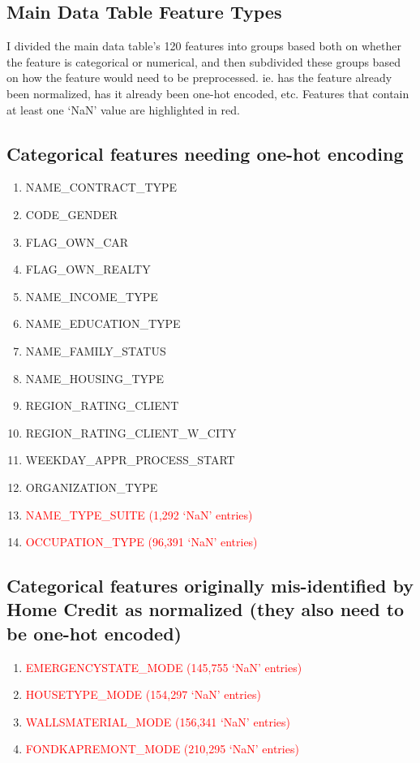 \documentclass[12pt, letterpaper]{article}
\begin{document}
\begin{appendices}
\section{Main Data Table Feature Types}
\label{appendix:maindatatablefeaturetypes}
I divided the main data table's 120 features into groups based both on whether the feature is categorical or numerical, and then subdivided these groups based on how the feature would need to be preprocessed. ie. has the feature already been normalized, has it already been one-hot encoded, etc. Features that contain at least one `NaN' value are highlighted in red.

\subsection{Categorical features needing one-hot encoding}
\label{catfeatneedonehotencoding}
\footnotesize
\begin{enumerate}
  \item NAME_CONTRACT_TYPE
  \item CODE_GENDER
  \item FLAG_OWN_CAR
  \item FLAG_OWN_REALTY
  \item NAME_INCOME_TYPE
  \item NAME_EDUCATION_TYPE
  \item NAME_FAMILY_STATUS
  \item NAME_HOUSING_TYPE
  \item REGION_RATING_CLIENT
  \item REGION_RATING_CLIENT_W_CITY
  \item WEEKDAY_APPR_PROCESS_START
  \item ORGANIZATION_TYPE
  \item \textcolor{red}{NAME_TYPE_SUITE (1,292 `NaN' entries)}
  \item \textcolor{red}{OCCUPATION_TYPE (96,391 `NaN' entries)}
\end{enumerate}
\normalsize

\subsection{Categorical features originally mis-identified by Home Credit as normalized (they also need to be one-hot encoded)}
\label{catfeatorigmisidentified}
\footnotesize
\begin{enumerate}
 \item \textcolor{red}{EMERGENCYSTATE_MODE (145,755 `NaN' entries)}
 \item \textcolor{red}{HOUSETYPE_MODE (154,297 `NaN' entries)}
 \item \textcolor{red}{WALLSMATERIAL_MODE (156,341 `NaN' entries)}
 \item \textcolor{red}{FONDKAPREMONT_MODE (210,295 `NaN' entries)}
\end{enumerate}
\normalsize


\end{appendices}
\end{document}
